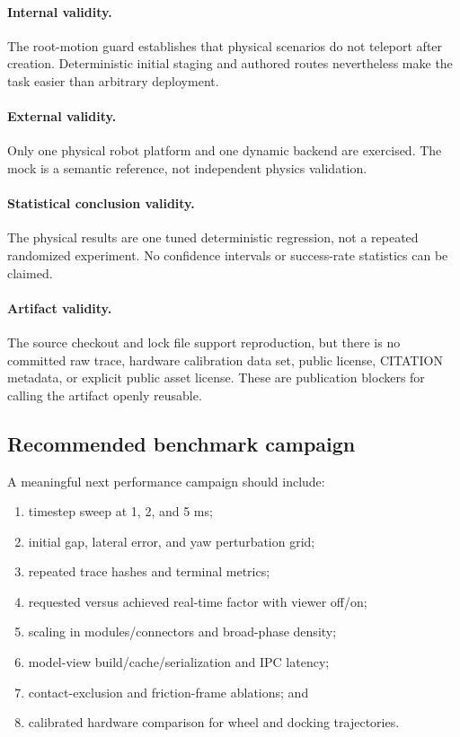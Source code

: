 \paragraph{Internal validity.}
The root-motion guard establishes that physical scenarios do not teleport after
creation. Deterministic initial staging and authored routes nevertheless make the task
easier than arbitrary deployment.

\paragraph{External validity.}
Only one physical robot platform and one dynamic backend are exercised. The mock is a
semantic reference, not independent physics validation.

\paragraph{Statistical conclusion validity.}
The physical results are one tuned deterministic regression, not a repeated randomized
experiment. No confidence intervals or success-rate statistics can be claimed.

\paragraph{Artifact validity.}
The source checkout and lock file support reproduction, but there is no committed raw
trace, hardware calibration data set, public license, CITATION metadata, or explicit
public asset license. These are publication blockers for calling the artifact openly
reusable.

\subsection{Recommended benchmark campaign}

A meaningful next performance campaign should include:

\begin{enumerate}
  \item timestep sweep at 1, 2, and 5 ms;
  \item initial gap, lateral error, and yaw perturbation grid;
  \item repeated trace hashes and terminal metrics;
  \item requested versus achieved real-time factor with viewer off/on;
  \item scaling in modules/connectors and broad-phase density;
  \item model-view build/cache/serialization and IPC latency;
  \item contact-exclusion and friction-frame ablations; and
  \item calibrated hardware comparison for wheel and docking trajectories.
\end{enumerate}

